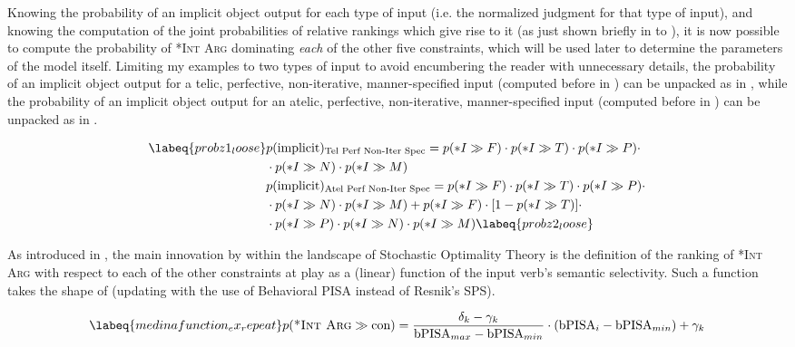Knowing the probability of an implicit object output for each type of input (i.e. the normalized judgment for that type of input), and knowing the computation of the joint probabilities of relative rankings which give rise to it (as just shown briefly in  to ), it is now possible to compute the probability of \textsc{*Int Arg} dominating \textit{each} of the other five constraints, which will be used later to determine the parameters of the model itself. Limiting my examples to two types of input to avoid encumbering the reader with unnecessary details, the probability of an implicit object output for a telic, perfective, non-iterative, manner-specified input (computed before in ) can be unpacked as in , while the probability of an implicit object output for an atelic, perfective, non-iterative, manner-specified input (computed before in ) can be unpacked as in .

\begin{align}  \labeq{probz1_loose}
    & p(\text{implicit})\textsubscript{Tel Perf Non-Iter Spec} = p(*I \gg F) \cdot p(*I \gg T) \cdot p(*I \gg P) \cdot \nonumber \\ & \cdot p(*I \gg N) \cdot p(*I \gg M) \\
    & p(\text{implicit})\textsubscript{Atel Perf Non-Iter Spec} = p(*I \gg F) \cdot p(*I \gg T) \cdot p(*I \gg P) \cdot \nonumber \\ & \cdot p(*I \gg N) \cdot p(*I \gg M) + p(*I \gg F) \cdot [1 - p(*I \gg T)] \cdot \nonumber \\ & \cdot p(*I \gg P) \cdot p(*I \gg N) \cdot p(*I \gg M) \labeq{probz2_loose}
\end{align}

As introduced in , the main innovation by \textcite{Medina2007} within the landscape of Stochastic Optimality Theory is the definition of the ranking of \textsc{*Int Arg} with respect to each of the other constraints at play as a (linear) function of the input verb's semantic selectivity. Such a function takes the shape of  (updating  with the use of Behavioral PISA instead of Resnik's SPS).

\begin{equation} \labeq{medinafunction_ex_repeat}
p(\textsc{*Int Arg} \gg \textrm{con}) = \frac{\delta_k - \gamma_k}{\textrm{bPISA}_{max} - \textrm{bPISA}_{min}} \cdot ({\textrm{bPISA}_{i} - \textrm{bPISA}_{min}}) + \gamma_k
\end{equation}

